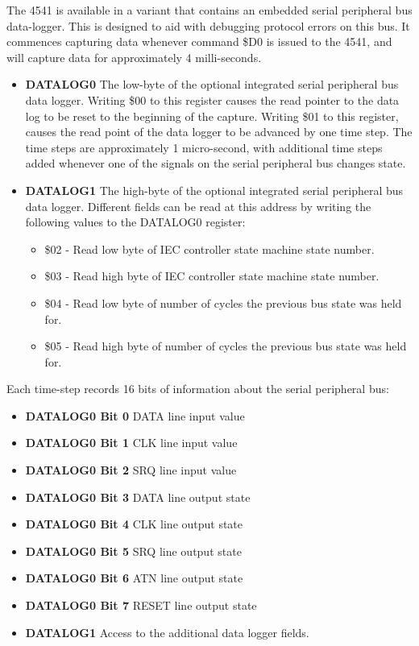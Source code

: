 The 4541 is available in a variant that contains an embedded serial
peripheral bus data-logger. This is designed to aid with debugging
protocol errors on this bus. It commences capturing data whenever
command \$D0 is issued to the 4541, and
will capture data for approximately 4 milli-seconds.

\begin{itemize}
  \item {\bf DATALOG0} The low-byte of the optional integrated serial
    peripheral bus data logger.  Writing \$00 to this register causes
    the read pointer to the data log to be reset to the beginning of
    the capture. Writing \$01 to this register, causes the
    read point of the data logger to be advanced by one time step.
    The time steps are approximately 1 micro-second, with additional
    time steps added whenever one of the signals on the serial
    peripheral bus changes state.
    \item {\bf DATALOG1} The high-byte of the optional integrated serial
      peripheral bus data logger. Different fields can be read at this
      address by writing the following values to the DATALOG0
      register:
      \begin{itemize}
        \item \$02 - Read low byte of IEC controller state machine
          state number.
        \item \$03 - Read high byte of IEC controller state machine
          state number.
        \item \$04 - Read low byte of number of cycles the previous bus state
          was held for.
        \item \$05 - Read high byte of number of cycles the previous bus state
          was held for.
        \end{itemize}
\end{itemize}

Each time-step records 16 bits of information about the serial
peripheral bus:
\begin{itemize}
\item {\bf DATALOG0 Bit 0} DATA line input value
\item {\bf DATALOG0 Bit 1} CLK line input value
\item {\bf DATALOG0 Bit 2} SRQ line input value
\item {\bf DATALOG0 Bit 3} DATA line output state
\item {\bf DATALOG0 Bit 4} CLK line output state
\item {\bf DATALOG0 Bit 5} SRQ line output state
\item {\bf DATALOG0 Bit 6} ATN line output state
\item {\bf DATALOG0 Bit 7} RESET line output state
\item {\bf DATALOG1} Access to the additional data logger fields.
\end{itemize}

